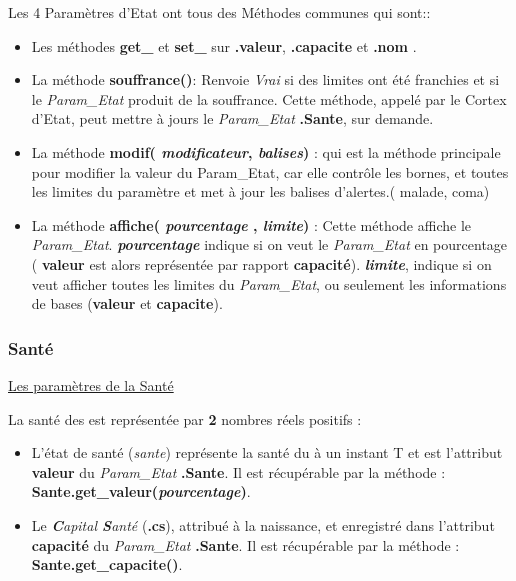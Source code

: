 \documentclass[french]{report}
\begin{document}
Les 4 Paramètres d'Etat ont tous des Méthodes communes qui sont::\\

\begin{itemize}
	\item Les méthodes \textbf{get\_} et \textbf{set\_} sur \textbf{.valeur}, \textbf{.capacite} et \textbf{.nom} .\\
	
	\item La méthode \textbf{souffrance()}: Renvoie \textit{Vrai} si des limites ont été franchies et si le \textit{Param\_Etat} produit de la souffrance. Cette méthode, appelé par le Cortex d'Etat, peut mettre à jours le \textit{Param\_Etat} \textbf{.Sante}, sur demande.\\
	
	\item La méthode \textbf{modif( \textit{modificateur}, \textit{balises})} : qui est la méthode principale pour modifier la valeur du Param\_Etat, car elle contrôle les bornes, et toutes les limites du paramètre et met à jour les balises d'alertes.( malade, coma)\\
	
	\item La méthode \textbf{affiche( \textit{pourcentage} , \textit{limite})} : Cette méthode affiche le \textit{Param\_Etat}. \textbf{\textit{pourcentage}} indique si on veut le \textit{Param\_Etat} en pourcentage ( \textbf{valeur} est alors représentée par rapport \textbf{capacité}). \textbf{\textit{limite}}, indique si on veut afficher toutes les limites du \textit{Param\_Etat}, ou seulement les informations de bases (\textbf{valeur} et \textbf{capacite}).\\
	
\end{itemize}
\subsubsection{Santé}\label{sante}
\begin{center}
	
\underline{Les paramètres de la Santé}

\end{center}
La santé des \CoCiX est représentée par \textbf{2} nombres réels positifs :\\
\begin{itemize}
\item L'état de santé (\textit{sante}) représente la santé du \CoCiX à un instant T et est l'attribut \textbf{valeur} du \textit{Param\_Etat} \textbf{.Sante}. Il est récupérable par la méthode : \textbf{Sante.get\_valeur(\textit{pourcentage})}.\\
\item Le \textit{\textbf{C}apital \textbf{S}anté} (\textbf{.cs}), attribué à la naissance, et enregistré dans l'attribut \textbf{capacité} du \textit{Param\_Etat} \textbf{.Sante}. Il est récupérable par la méthode : \textbf{Sante.get\_capacite()}.\\
\end{itemize}
\end{document}
